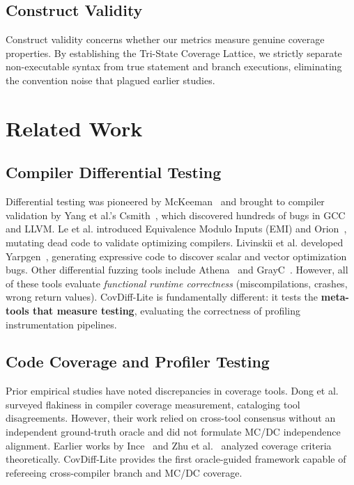 \documentclass[sigconf,review,anonymous=false]{acmart}
\theoremstyle{definition}
\begin{document}
\subsection{Construct Validity}
Construct validity concerns whether our metrics measure genuine coverage properties. By establishing the Tri-State Coverage Lattice, we strictly separate non-executable syntax from true statement and branch executions, eliminating the convention noise that plagued earlier studies.

\section{Related Work}

\subsection{Compiler Differential Testing}
Differential testing was pioneered by McKeeman~\cite{mckeeman1998differential} and brought to compiler validation by Yang et al.'s Csmith~\cite{yang2011finding}, which discovered hundreds of bugs in GCC and LLVM. Le et al. introduced Equivalence Modulo Inputs (EMI) and Orion~\cite{le2014compiler}, mutating dead code to validate optimizing compilers. Livinskii et al. developed Yarpgen~\cite{livinskii2020random}, generating expressive code to discover scalar and vector optimization bugs. Other differential fuzzing tools include Athena~\cite{le2015finding} and GrayC~\cite{cui2023grayc}.
However, all of these tools evaluate \textit{functional runtime correctness} (miscompilations, crashes, wrong return values). CovDiff-Lite is fundamentally different: it tests the \textbf{meta-tools that measure testing}, evaluating the correctness of profiling instrumentation pipelines.

\subsection{Code Coverage and Profiler Testing}
Prior empirical studies have noted discrepancies in coverage tools. Dong et al.~\cite{dong2020flaky} surveyed flakiness in compiler coverage measurement, cataloging tool disagreements. However, their work relied on cross-tool consensus without an independent ground-truth oracle and did not formulate MC/DC independence alignment. Earlier works by Ince~\cite{ince1987importance} and Zhu et al.~\cite{zhu1997software} analyzed coverage criteria theoretically. CovDiff-Lite provides the first oracle-guided framework capable of refereeing cross-compiler branch and MC/DC coverage.
\end{document}

